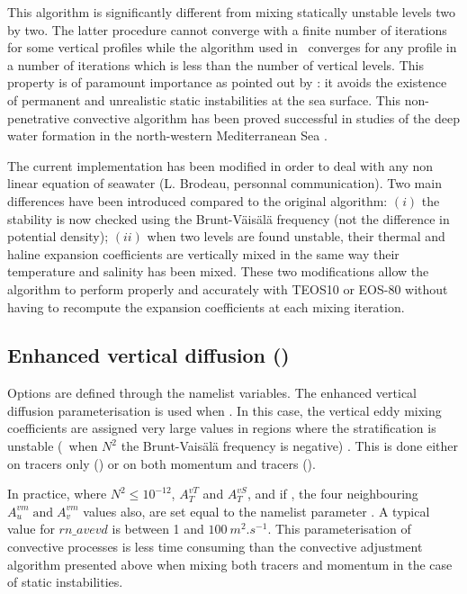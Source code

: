 \documentclass[../main/NEMO_manual]{subfiles}
\begin{document}
This algorithm is significantly different from mixing statically unstable levels two by two.
The latter procedure cannot converge with a finite number of iterations for some vertical profiles while
the algorithm used in \NEMO\ converges for any profile in a number of iterations which is less than
the number of vertical levels.
This property is of paramount importance as pointed out by \citet{killworth_iprc89}:
it avoids the existence of permanent and unrealistic static instabilities at the sea surface.
This non-penetrative convective algorithm has been proved successful in studies of the deep water formation in
the north-western Mediterranean Sea \citep{madec.delecluse.ea_JPO91, madec.chartier.ea_DAO91, madec.crepon_iprc91}.

The current implementation has been modified in order to deal with any non linear equation of seawater
(L. Brodeau, personnal communication).
Two main differences have been introduced compared to the original algorithm:
$(i)$ the stability is now checked using the Brunt-V\"{a}is\"{a}l\"{a} frequency
(not the difference in potential density);
$(ii)$ when two levels are found unstable, their thermal and haline expansion coefficients are vertically mixed in
the same way their temperature and salinity has been mixed.
These two modifications allow the algorithm to perform properly and accurately with TEOS10 or EOS-80 without
having to recompute the expansion coefficients at each mixing iteration.

\subsection[Enhanced vertical diffusion (\forcode{ln_zdfevd})]{Enhanced vertical diffusion (\protect{})}
\label{subsec:ZDF_evd}

Options are defined through the   namelist variables.
The enhanced vertical diffusion parameterisation is used when .
In this case, the vertical eddy mixing coefficients are assigned very large values
in regions where the stratification is unstable
(\ie\ when $N^2$ the Brunt-Vais\"{a}l\"{a} frequency is negative) \citep{lazar_phd97, lazar.madec.ea_JPO99}.
This is done either on tracers only () or
on both momentum and tracers ().

In practice, where $N^2\leq 10^{-12}$, $A_T^{vT}$ and $A_T^{vS}$, and if ,
the four neighbouring $A_u^{vm} \;\mbox{and}\;A_v^{vm}$ values also, are set equal to
the namelist parameter .
A typical value for $rn\_avevd$ is between 1 and $100~m^2.s^{-1}$.
This parameterisation of convective processes is less time consuming than
the convective adjustment algorithm presented above when mixing both tracers and
momentum in the case of static instabilities.
\end{document}
